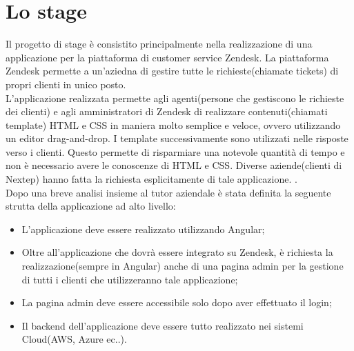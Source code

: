 \section{Lo stage}
Il progetto di stage è consistito principalmente nella realizzazione di una applicazione per la piattaforma di customer service Zendesk. La piattaforma Zendesk permette a un'aziedna di gestire tutte le richieste(chiamate tickets) di propri clienti in unico posto. \\ L'applicazione realizzata permette agli agenti(persone che gestiscono le richieste dei clienti) e agli amministratori di Zendesk di realizzare contenuti(chiamati template) HTML e CSS in maniera molto semplice e veloce, ovvero utilizzando un editor drag-and-drop. I template successivamente sono utilizzati nelle risposte verso i clienti. Questo permette di risparmiare una notevole quantità di tempo e non è necessario avere le conoscenze di HTML e CSS. Diverse aziende(clienti di Nextep) hanno fatta la richiesta esplicitamente di tale applicazione. .
\\

Dopo una breve analisi insieme al tutor aziendale è stata definita la seguente strutta della applicazione ad alto livello: 
\begin{itemize}
	\item L'applicazione deve essere realizzato utilizzando Angular; 
	\item Oltre all'applicazione che dovrà essere integrato su Zendesk, è richiesta la realizzazione(sempre in Angular) anche di una pagina admin per la gestione di tutti i clienti che utilizzeranno tale applicazione;
	\item La pagina admin deve essere accessibile solo dopo aver effettuato il login;
	\item Il backend dell'applicazione deve essere tutto realizzato nei sistemi Cloud(AWS, Azure ec..).
\end{itemize} 